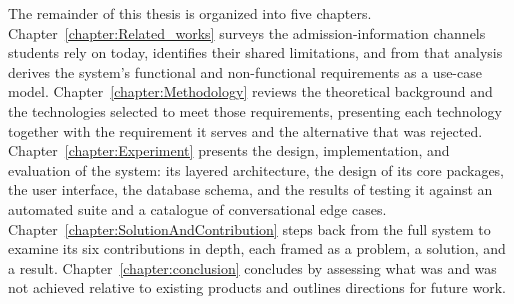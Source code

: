 \documentclass[../main.tex]{subfiles}
\begin{document}
The remainder of this thesis is organized into five chapters.
Chapter~\ref{chapter:Related_works} surveys the admission-information channels students rely on today, identifies their shared limitations, and from that analysis derives the system's functional and non-functional requirements as a use-case model.
Chapter~\ref{chapter:Methodology} reviews the theoretical background and the technologies selected to meet those requirements, presenting each technology together with the requirement it serves and the alternative that was rejected.
Chapter~\ref{chapter:Experiment} presents the design, implementation, and evaluation of the system: its layered architecture, the design of its core packages, the user interface, the database schema, and the results of testing it against an automated suite and a catalogue of conversational edge cases.
Chapter~\ref{chapter:SolutionAndContribution} steps back from the full system to examine its six contributions in depth, each framed as a problem, a solution, and a result.
Chapter~\ref{chapter:conclusion} concludes by assessing what was and was not achieved relative to existing products and outlines directions for future work.
\end{document}
